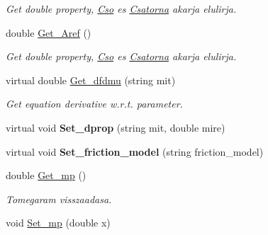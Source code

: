 \begin{DoxyCompactItemize}
\begin{DoxyCompactList}\small\item\em Get double property, \hyperlink{class_cso}{Cso} es \hyperlink{class_csatorna}{Csatorna} akarja elulirja. \end{DoxyCompactList}\item 
double \hyperlink{class_agelem_a47b441de19cf771363bf25e3f65fc228}{Get\+\_\+\+Aref} ()\hypertarget{class_agelem_a47b441de19cf771363bf25e3f65fc228}{}\label{class_agelem_a47b441de19cf771363bf25e3f65fc228}

\begin{DoxyCompactList}\small\item\em Get double property, \hyperlink{class_cso}{Cso} es \hyperlink{class_csatorna}{Csatorna} akarja elulirja. \end{DoxyCompactList}\item 
virtual double \hyperlink{class_agelem_a47c5952bbfa4ca32910f361ee47f6ae8}{Get\+\_\+dfdmu} (string mit)\hypertarget{class_agelem_a47c5952bbfa4ca32910f361ee47f6ae8}{}\label{class_agelem_a47c5952bbfa4ca32910f361ee47f6ae8}

\begin{DoxyCompactList}\small\item\em Get equation derivative w.\+r.\+t. parameter. \end{DoxyCompactList}\item 
virtual void {\bfseries Set\+\_\+dprop} (string mit, double mire)\hypertarget{class_agelem_aa830fcc840b21486fdecd40712f3373e}{}\label{class_agelem_aa830fcc840b21486fdecd40712f3373e}

\item 
virtual void {\bfseries Set\+\_\+friction\+\_\+model} (string friction\+\_\+model)\hypertarget{class_agelem_a1285244f5e03d7db2092a2e5c14df288}{}\label{class_agelem_a1285244f5e03d7db2092a2e5c14df288}

\item 
double \hyperlink{class_agelem_ab1bd05d137565c3a964e31598f8e2e71}{Get\+\_\+mp} ()\hypertarget{class_agelem_ab1bd05d137565c3a964e31598f8e2e71}{}\label{class_agelem_ab1bd05d137565c3a964e31598f8e2e71}

\begin{DoxyCompactList}\small\item\em Tomegaram visszaadasa. \end{DoxyCompactList}\item 
void \hyperlink{class_agelem_a7d72a3740ccae5c739eaa3c7b2697c2c}{Set\+\_\+mp} (double x)\hypertarget{class_agelem_a7d72a3740ccae5c739eaa3c7b2697c2c}{}\label{class_agelem_a7d72a3740ccae5c739eaa3c7b2697c2c}


\end{DoxyCompactItemize}
